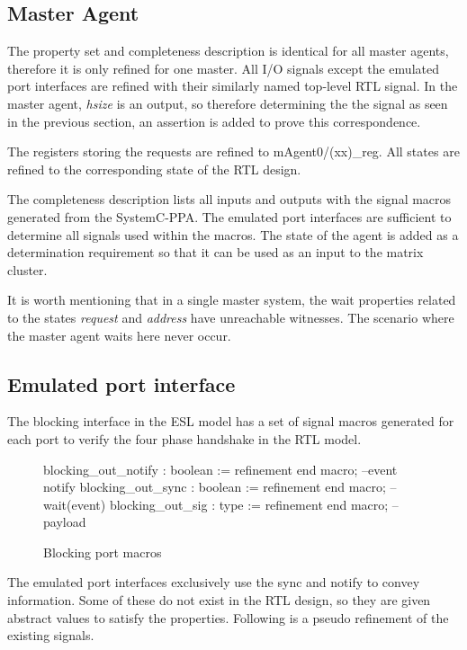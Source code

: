 \subsection{Master Agent}
The property set and completeness description is identical for all master agents, therefore it is only refined for one master. 
All I/O signals except the emulated port interfaces are refined with their similarly named top-level RTL signal. In the master agent, \textit{hsize} is an output, so therefore determining the the signal as seen in the previous section, an assertion is added to prove this correspondence. \par
The registers storing the requests are refined to mAgent0/(xx)\_reg. All states are refined to the corresponding state of the RTL design.\par
The completeness description lists all inputs and outputs with the signal macros generated from the SystemC-PPA. The emulated port interfaces are sufficient to determine all signals used within the macros. The state of the agent is added as a determination requirement so that it can be used as an input to the matrix cluster. \par
It is worth mentioning that in a single master system, the wait properties related to the states \textit{request} and \textit{address} have unreachable witnesses. The scenario where the master agent waits here never occur. 

\subsection{Emulated port interface}
\label{sub:em-port-refine}
The blocking interface in the ESL model has a set of signal macros generated for each port to verify the four phase handshake in the RTL model.
\begin{figure}[h!]
\begin{VHI}
blocking_out_notify : boolean := refinement end macro; --event notify
blocking_out_sync : boolean := refinement end macro;   --wait(event)
blocking_out_sig : type := refinement end macro;       --payload
\end{VHI}
\caption{Blocking port macros}
\end{figure}

The emulated port interfaces exclusively use the sync and notify to convey information. Some of these do not exist in the RTL design, so they are given abstract values to satisfy the properties. Following is a pseudo refinement of the existing signals.

